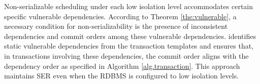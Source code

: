 Non-serializable scheduling under each low isolation level accommodates certain specific vulnerable dependencies. According to Theorem \ref{the:vulnerable}, a necessary condition for non-serializability is the presence of inconsistent dependencies and commit orders among these vulnerable dependencies. \sysname identifies static vulnerable dependencies from the transaction templates and ensures that, in transactions involving these dependencies, the commit order aligns with the dependency order as specified in Algorithm \ref{alg.transaction}. This approach maintains SER even when the RDBMS is configured to low isolation levels.


